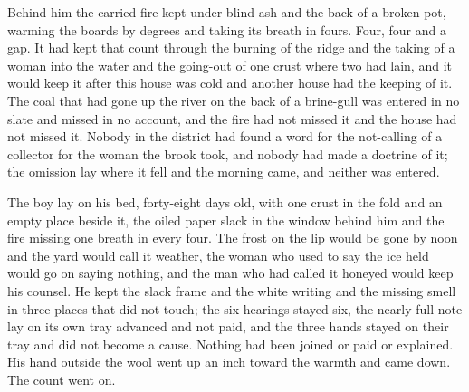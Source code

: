 Behind him the carried fire kept under blind ash and the back of a broken pot, warming the boards by degrees and taking its breath in fours. Four, four and a gap. It had kept that count through the burning of the ridge and the taking of a woman into the water and the going-out of one crust where two had lain, and it would keep it after this house was cold and another house had the keeping of it. The coal that had gone up the river on the back of a brine-gull was entered in no slate and missed in no account, and the fire had not missed it and the house had not missed it. Nobody in the district had found a word for the not-calling of a collector for the woman the brook took, and nobody had made a doctrine of it; the omission lay where it fell and the morning came, and neither was entered.

The boy lay on his bed, forty-eight days old, with one crust in the fold and an empty place beside it, the oiled paper slack in the window behind him and the fire missing one breath in every four. The frost on the lip would be gone by noon and the yard would call it weather, the woman who used to say the ice held would go on saying nothing, and the man who had called it honeyed would keep his counsel. He kept the slack frame and the white writing and the missing smell in three places that did not touch; the six hearings stayed six, the nearly-full note lay on its own tray advanced and not paid, and the three hands stayed on their tray and did not become a cause. Nothing had been joined or paid or explained. His hand outside the wool went up an inch toward the warmth and came down. The count went on.
